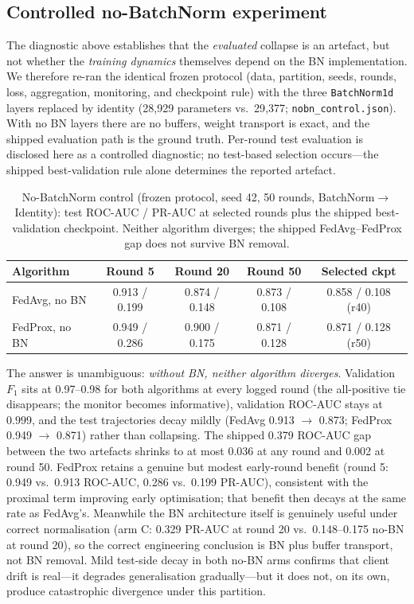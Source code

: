 \subsection{Controlled no-BatchNorm experiment}
\label{sec:res-nobn}

The diagnostic above establishes that the \emph{evaluated} collapse is
an artefact, but not whether the \emph{training dynamics} themselves
depend on the BN implementation. We therefore re-ran the identical
frozen protocol (data, partition, seeds, rounds, loss, aggregation,
monitoring, and checkpoint rule) with the three \texttt{BatchNorm1d}
layers replaced by identity (28{,}929 parameters vs.\ 29{,}377;
\texttt{nobn\_control.json}). With no BN layers there are no buffers,
weight transport is exact, and the shipped evaluation path is the
ground truth. Per-round test evaluation is disclosed here as a
controlled diagnostic; no test-based selection occurs---the shipped
best-validation rule alone determines the reported artefact.

\begin{table}[t]
\centering
\caption{No-BatchNorm control (frozen protocol, seed 42, 50 rounds,
BatchNorm$\to$Identity): test ROC-AUC / PR-AUC at selected rounds plus
the shipped best-validation checkpoint. Neither algorithm diverges;
the shipped FedAvg--FedProx gap does not survive BN removal.}
\label{tab:nobn}
\small
\begin{tabular}{@{}l c c c c@{}}
\toprule
\textbf{Algorithm} & \textbf{Round 5} & \textbf{Round 20} &
\textbf{Round 50} & \textbf{Selected ckpt} \\
\midrule
FedAvg, no BN & 0.913 / 0.199 & 0.874 / 0.148 & 0.873 / 0.108 & 0.858 / 0.108 (r40) \\
FedProx, no BN & 0.949 / 0.286 & 0.900 / 0.175 & 0.871 / 0.128 & 0.871 / 0.128 (r50) \\
\bottomrule
\end{tabular}
\end{table}

The answer is unambiguous: \emph{without BN, neither algorithm
diverges}. Validation $F_1$ sits at 0.97--0.98 for both algorithms at
every logged round (the all-positive tie disappears; the monitor
becomes informative), validation ROC-AUC stays at $0.999$, and the
test trajectories decay mildly (FedAvg 0.913 $\to$ 0.873; FedProx
0.949 $\to$ 0.871) rather than collapsing. The shipped 0.379 ROC-AUC
gap between the two artefacts shrinks to at most 0.036 at any round
and 0.002 at round 50. FedProx retains a genuine but modest
early-round benefit (round 5: 0.949 vs.\ 0.913 ROC-AUC, 0.286
vs.\ 0.199 PR-AUC), consistent with the proximal term improving early
optimisation; that benefit then decays at the same rate as FedAvg's.
Meanwhile the BN architecture itself is genuinely useful under correct
normalisation (arm C: 0.329 PR-AUC at round 20 vs.\ 0.148--0.175
no-BN at round 20), so the correct engineering conclusion is BN plus
buffer transport, not BN removal. Mild test-side decay in both no-BN
arms confirms that client drift is real---it degrades generalisation
gradually---but it does not, on its own, produce catastrophic
divergence under this partition.

